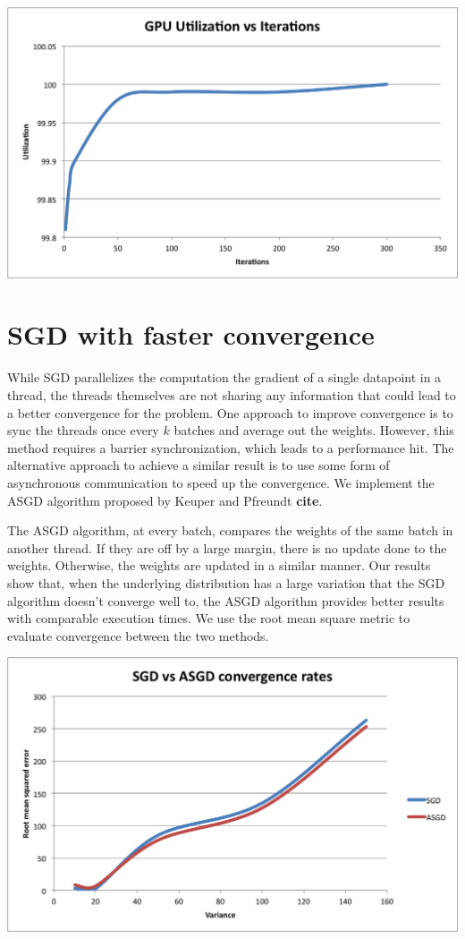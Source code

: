 \documentclass{article}
\begin{document}
\includegraphics[scale=0.75]{utilization.png}

\pagebreak

\section{SGD with faster convergence}

While SGD parallelizes the computation the gradient of a single datapoint in a thread, the threads themselves are not sharing any information that could lead to a better convergence for the problem. One approach to improve convergence is to sync the threads once every $k$ batches and average out the weights. However, this method requires a barrier synchronization, which leads to a performance hit. The alternative approach to achieve a similar result is to use some form of asynchronous communication to speed up the convergence. We implement the ASGD algorithm proposed by Keuper and Pfreundt \textbf{cite}.

The ASGD algorithm, at every batch, compares the weights of the same batch in another thread. If they are off by a large margin, there is no update done to the weights. Otherwise, the weights are updated in a similar manner. Our results show that, when the underlying distribution has a large variation that the SGD algorithm doesn't converge well to, the ASGD algorithm provides better results with comparable execution times. We use the root mean square metric to evaluate convergence between the two methods.

\includegraphics[scale=0.75]{sgdvasgd.png}
\end{document}

